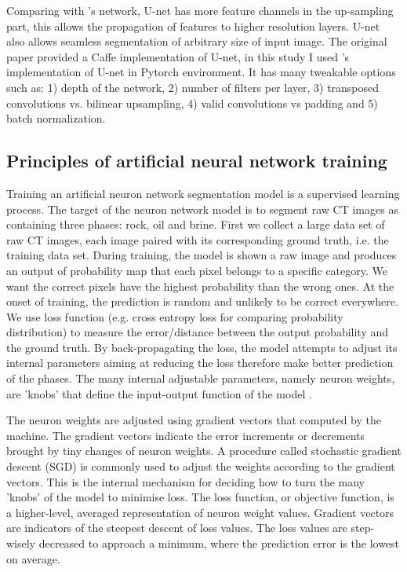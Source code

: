 Comparing with \citet{ciresan2012deep}'s network, U-net has more feature channels in the up-sampling part, this allows the propagation of features to higher resolution layers. U-net also allows seamless segmentation of arbitrary size of input image. The original paper provided a Caffe \cite{jia2014caffe} implementation of U-net, in this study I used \citet{Jorispytorch}'s implementation of U-net in Pytorch environment. It has many tweakable options such as: 1) depth of the network, 2) number of filters per layer, 3) transposed convolutions vs. bilinear upsampling, 4) valid convolutions vs padding and 5) batch normalization.



\subsection{Principles of artificial neural network training}
Training an artificial neuron network segmentation model is a supervised learning process. The target of the neuron network model is to segment raw CT images as containing three phases: rock, oil and brine. First we collect a large data set of raw CT images, each image paired with its corresponding ground truth, i.e. the training data set. During training, the model is shown a raw image and produces an output of probability map that each pixel belongs to a specific category. We want the correct pixels have the highest probability than the wrong ones. At the onset of training, the prediction is random and unlikely to be correct everywhere. We use loss function (e.g. cross entropy loss for comparing probability distribution) to measure the error/distance between the output probability and the ground truth. By back-propagating the loss, the model attempts to adjust its internal parameters aiming at reducing the loss therefore make better prediction of the phases. The many internal adjustable parameters, namely neuron weights, are 'knobs' that define the input-output function of the model \citep{lecun2015deep}.

The neuron weights are adjusted using gradient vectors that computed by the machine. The gradient vectors indicate the error increments or decrements brought by tiny changes of neuron weights. A procedure called stochastic gradient descent (SGD) is commonly used to adjust the weights according to the gradient vectors. This is the internal mechanism for deciding how to turn the many 'knobs' of the model to minimise loss. The loss function, or objective function, is a higher-level, averaged representation of neuron weight values. Gradient vectors are indicators of the steepest descent of loss values. The loss values are step-wisely decreased to approach a minimum, where the prediction error is the lowest on average. 

